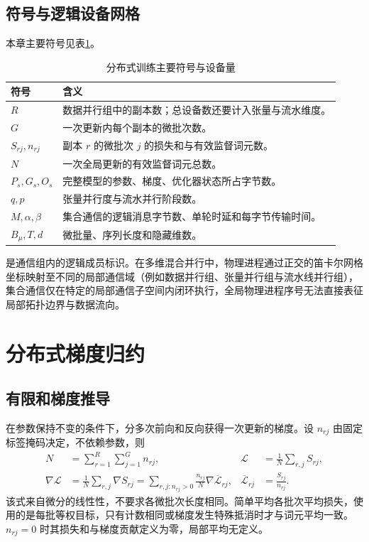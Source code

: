 \documentclass[../textbook.tex]{subfiles}
\begin{document}
\subsection{符号与逻辑设备网格}
本章主要符号见表\ref{tab:distributed-training-symbols}。
\begin{table}[htbp]
\centering
\caption{分布式训练主要符号与设备量}\label{tab:distributed-training-symbols}
\begin{tabular}{ll}
\toprule
符号 & 含义\\
\midrule
$R$ & 数据并行组中的副本数；总设备数还要计入张量与流水维度。\\
$G$ & 一次更新内每个副本的微批次数。\\
$S_{rj},n_{rj}$ & 副本 $r$ 的微批次 $j$ 的损失和与有效监督词元数。\\
$N$ & 一次全局更新的有效监督词元总数。\\
$P_s,G_s,O_s$ & 完整模型的参数、梯度、优化器状态所占字节数。\\
$q,p$ & 张量并行度与流水并行阶段数。\\
$M,\alpha,\beta$ & 集合通信的逻辑消息字节数、单轮时延和每字节传输时间。\\
$B_\mu,T,d$ & 微批量、序列长度和隐藏维数。\\
\bottomrule
\end{tabular}
\end{table}

是通信组内的逻辑成员标识。在多维混合并行中，物理进程通过正交的笛卡尔网格坐标映射至不同的局部通信域（例如数据并行组、张量并行组与流水线并行组），集合通信仅在特定的局部通信子空间内闭环执行，全局物理进程序号无法直接表征局部拓扑边界与数据流向。

\section{分布式梯度归约}

\subsection{有限和梯度推导}
在参数保持不变的条件下，分多次前向和反向获得一次更新的梯度。设 $n_{rj}$ 由固定标签掩码决定，不依赖参数，则
\begin{align}
 N&=\sum_{r=1}^R\sum_{j=1}^G n_{rj},&
 \mathcal L&=\frac{1}{N}\sum_{r,j}S_{rj},\\
 \nabla\mathcal L&=\frac{1}{N}\sum_{r,j}\nabla S_{rj}
 =\sum_{r,j:n_{rj}>0}\frac{n_{rj}}{N}\nabla\overline{\mathcal L}_{rj},&
 \overline{\mathcal L}_{rj}&=\frac{S_{rj}}{n_{rj}}.
 \label{eq:dist-token-gradient}
\end{align}
该式来自微分的线性性，不要求各微批次长度相同。简单平均各批次平均损失，使用的是每批等权目标，只有计数相同或梯度发生特殊抵消时才与词元平均一致。$n_{rj}=0$ 时其损失和与梯度贡献定义为零，局部平均无定义。
\end{document}
